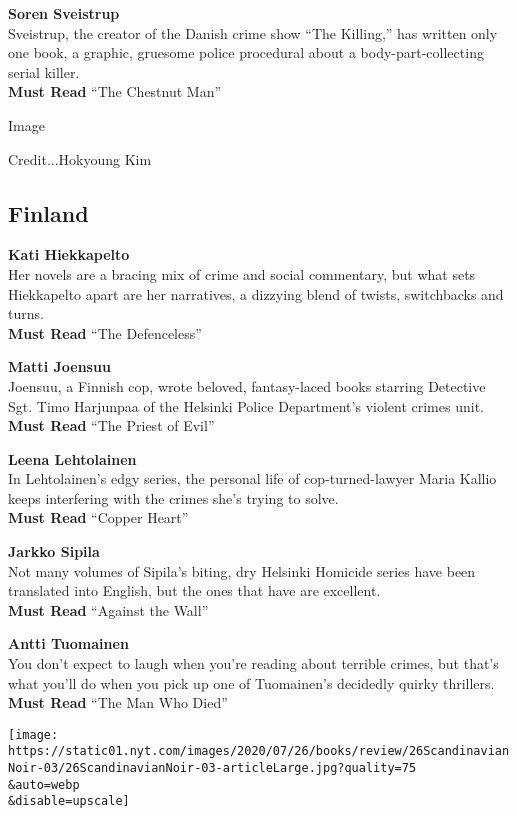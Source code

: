 \textbf{Soren Sveistrup}\\
Sveistrup, the creator of the Danish crime show ``The Killing,'' has
written only one book, a graphic, gruesome police procedural about a
body-part-collecting serial killer.\\
\textbf{Must Read} ``The Chestnut Man''

Image

Credit...Hokyoung Kim

\hypertarget{finland}{%
\subsection{Finland}\label{finland}}

\textbf{Kati Hiekkapelto}\\
Her novels are a bracing mix of crime and social commentary, but what
sets Hiekkapelto apart are her narratives, a dizzying blend of twists,
switchbacks and turns.\\
\textbf{Must Read} ``The Defenceless''

\textbf{Matti Joensuu}\\
Joensuu, a Finnish cop, wrote beloved, fantasy-laced books starring
Detective Sgt. Timo Harjunpaa of the Helsinki Police Department's
violent crimes unit.\\
\textbf{Must Read} ``The Priest of Evil''

\textbf{Leena Lehtolainen}\\
In Lehtolainen's edgy series, the personal life of cop-turned-lawyer
Maria Kallio keeps interfering with the crimes she's trying to solve.\\
\textbf{Must Read} ``Copper Heart''

\textbf{Jarkko Sipila}\\
Not many volumes of Sipila's biting, dry Helsinki Homicide series have
been translated into English, but the ones that have are excellent.\\
\textbf{Must Read} ``Against the Wall''

\textbf{Antti Tuomainen}\\
You don't expect to laugh when you're reading about terrible crimes, but
that's what you'll do when you pick up one of Tuomainen's decidedly
quirky thrillers.\\
\textbf{Must Read} ``The Man Who Died''

\texttt{[image: https://static01.nyt.com/images/2020/07/26/books/review/26ScandinavianNoir-03/26ScandinavianNoir-03-articleLarge.jpg?quality=75\\\&auto=webp\\\&disable=upscale]}

